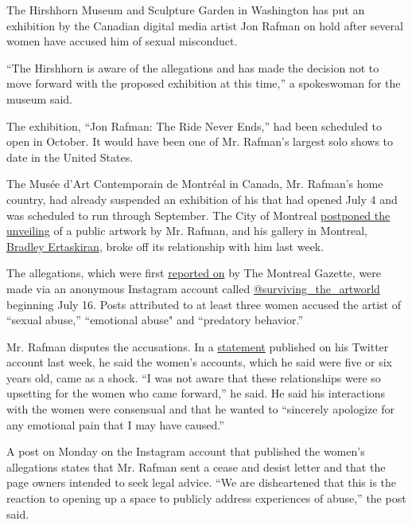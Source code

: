 The Hirshhorn Museum and Sculpture Garden in Washington has put an
exhibition by the Canadian digital media artist Jon Rafman on hold after
several women have accused him of sexual misconduct.

``The Hirshhorn is aware of the allegations and has made the decision
not to move forward with the proposed exhibition at this time,'' a
spokeswoman for the museum said.

The exhibition, ``Jon Rafman: The Ride Never Ends,'' had been scheduled
to open in October. It would have been one of Mr. Rafman's largest solo
shows to date in the United States.

The Musée d'Art Contemporain de Montréal in Canada, Mr. Rafman's home
country, had already suspended an exhibition of his that had opened July
4 and was scheduled to run through September. The City of Montreal
\href{https://montrealgazette.com/news/local-news/city-puts-rafman-public-artwork-on-hold-re-sexual-coercion-allegations}{postponed
the unveiling} of a public artwork by Mr. Rafman, and his gallery in
Montreal, \href{http://bradleyertaskiran.com/en/}{Bradley Ertaskiran},
broke off its relationship with him last week.

The allegations, which were first
\href{https://montrealgazette.com/entertainment/arts/montreal-art-star-jon-rafman-facing-allegations-of-sexual-coercion}{reported
on} by The Montreal Gazette, were made via an anonymous Instagram
account called
\href{https://www.instagram.com/surviving_the_artworld/}{@surviving\_the\_artworld}
beginning July 16. Posts attributed to at least three women accused the
artist of ``sexual abuse,'' ``emotional abuse" and ``predatory
behavior.''

Mr. Rafman disputes the accusations. In a
\href{https://twitter.com/jonrafman/status/1286445645633449985}{statement}
published on his Twitter account last week, he said the women's
accounts, which he said were five or six years old, came as a shock. ``I
was not aware that these relationships were so upsetting for the women
who came forward,'' he said. He said his interactions with the women
were consensual and that he wanted to ``sincerely apologize for any
emotional pain that I may have caused.''

A post on Monday on the Instagram account that published the women's
allegations states that Mr. Rafman sent a cease and desist letter and
that the page owners intended to seek legal advice. ``We are
disheartened that this is the reaction to opening up a space to publicly
address experiences of abuse,'' the post said.

